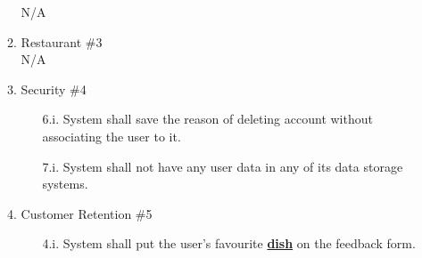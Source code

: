 \documentclass[]{article}
\begin{document}
\begin{enumerate}[{\bf BE1.}]
\begin{enumerate}[{\bf VP1.}]
				N/A
			\item Restaurant \#3 \\
				N/A
			\item Security \#4 
				\begin{enumerate}
					\item [6.i.] System shall save the reason of deleting account without associating the user to it.
					\item [7.i.] System shall not have any user data in any of its data storage systems.
				\end{enumerate}
			\item Customer Retention \#5
				\begin{enumerate}
					\item[4.i.] System shall put the user's favourite \hyperref[Dish]{\textbf{dish}} on the feedback form.
				\end{enumerate}
		\end{enumerate}


\end{enumerate}
\end{document}
